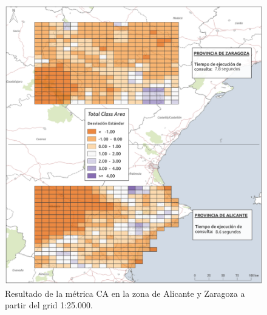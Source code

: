 \begin{figure}
\begin{center}
\includegraphics[width=\textwidth]{ResultadosyDiscusion/Figs/Results/c_25.png}
\caption{Resultado de la métrica CA en la zona de Alicante y Zaragoza a partir del grid 1:25.000.}
\end{center}
\end{figure}

